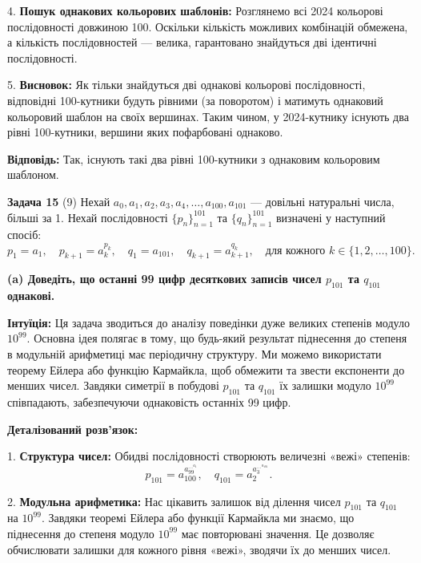 \documentclass{article}
\begin{document}
4. \textbf{Пошук однакових кольорових шаблонів:}  
   Розглянемо всі 2024 кольорові послідовності довжиною 100. Оскільки кількість можливих комбінацій обмежена, а кількість послідовностей — велика, гарантовано знайдуться дві ідентичні послідовності.

5. \textbf{Висновок:}  
   Як тільки знайдуться дві однакові кольорові послідовності, відповідні 100-кутники будуть рівними (за поворотом) і матимуть однаковий кольоровий шаблон на своїх вершинах. Таким чином, у 2024-кутнику існують два рівні 100-кутники, вершини яких пофарбовані однаково.

\textbf{Відповідь:}  
Так, існують такі два рівні 100-кутники з однаковим кольоровим шаблоном.


\bigskip

\noindent\textbf{Задача 15} (9) Нехай \( a_0, a_1, a_2, a_3, a_4, \dots, a_{100}, a_{101} \) — довільні натуральні числа, більші за 1. Нехай послідовності \( \{p_n\}_{n=1}^{101} \) та \( \{q_n\}_{n=1}^{101} \) визначені у наступний спосіб:
\[
p_1 = a_1, \quad p_{k+1} = a_k^{p_k}, \quad q_1 = a_{101}, \quad q_{k+1} = a_{k+1}^{q_k}, \quad \text{для кожного } k \in \{1, 2, \dots, 100\}.
\]

\textbf{(a) Доведіть, що останні 99 цифр десяткових записів чисел \( p_{101} \) та \( q_{101} \) однакові.}

\textbf{Інтуїція:}  
Ця задача зводиться до аналізу поведінки дуже великих степенів модуло \( 10^{99} \). Основна ідея полягає в тому, що будь-який результат піднесення до степеня в модульній арифметиці має періодичну структуру. Ми можемо використати теорему Ейлера або функцію Кармайкла, щоб обмежити та звести експоненти до менших чисел. Завдяки симетрії в побудові \( p_{101} \) та \( q_{101} \) їх залишки модуло \( 10^{99} \) співпадають, забезпечуючи однаковість останніх 99 цифр.

\textbf{Деталізований розв'язок:}

1. \textbf{Структура чисел:}  
   Обидві послідовності створюють величезні «вежі» степенів:
   \[
   p_{101} = a_{100}^{a_{99}^{\dots^{a_1}}}, \quad q_{101} = a_2^{a_3^{\dots^{a_{101}}}}.
   \]

2. \textbf{Модульна арифметика:}  
   Нас цікавить залишок від ділення чисел \( p_{101} \) та \( q_{101} \) на \( 10^{99} \). Завдяки теоремі Ейлера або функції Кармайкла ми знаємо, що піднесення до степеня модуло \( 10^{99} \) має повторювані значення. Це дозволяє обчислювати залишки для кожного рівня «вежі», зводячи їх до менших чисел.
\end{document}

